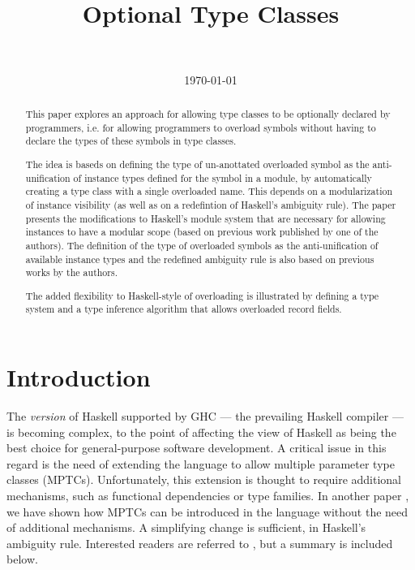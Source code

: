 \documentclass{article}
\author{\ }
\title{Optional Type Classes}
\date{\today}
\begin{document}
\maketitle

\begin{abstract}

This paper explores an approach for allowing type classes to be
optionally declared by programmers, i.e. for allowing programmers to
overload symbols without having to declare the types of these symbols
in type classes.

The idea is baseds on defining the type of un-anottated overloaded
symbol as the anti-unification of instance types defined for the
symbol in a module, by automatically creating a type class with a
single overloaded name. This depends on a modularization of instance
visibility (as well as on a redefintion of Haskell's ambiguity rule).
The paper presents the modifications to Haskell's module system that
are necessary for allowing instances to have a modular scope (based on
previous work published by one of the authors). The definition of the
type of overloaded symbols as the anti-unification of available
instance types and the redefined ambiguity rule is also based on
previous works by the authors. 

The added flexibility to Haskell-style of overloading is illustrated
by defining a type system and a type inference algorithm that allows
overloaded record fields. 

\end{abstract}

\section{Introduction}
\label{sec:intro}

The {\em version\/} of Haskell supported by GHC --- the prevailing
Haskell compiler --- is becoming complex, to the point of affecting
the view of Haskell as being the best choice for general-purpose
software development. A critical issue in this regard is the need of
extending the language to allow multiple parameter type classes
(MPTCs). Unfortunately, this extension is thought to require
additional mechanisms, such as functional dependencies or type
families. In another paper
\cite{JBCS-Ambiguity-and-constrained-polymorphism}, we have shown how
MPTCs can be introduced in the language without the need of additional
mechanisms. A simplifying change is sufficient, in Haskell's ambiguity
rule. Interested readers are referred to
\cite{JBCS-Ambiguity-and-constrained-polymorphism}, but a summary is
included below.
\end{document}
